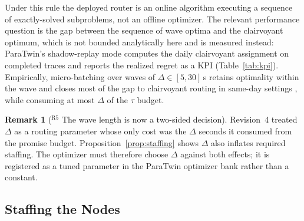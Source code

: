 \documentclass[10pt,twocolumn,letterpaper]{article}
\theoremstyle{definition}
\newtheorem{remark}{Remark}
\begin{document}
Under this rule the deployed router is an online algorithm executing a sequence of exactly-solved subproblems, not an offline optimizer. The relevant performance question is the gap between the sequence of wave optima and the clairvoyant optimum, which is not bounded analytically here and is measured instead: ParaTwin's shadow-replay mode computes the daily clairvoyant assignment on completed traces and reports the realized regret as a KPI (Table~\ref{tab:kpi}). Empirically, micro-batching over waves of $\Delta\in[5,30]$\,s retains optimality within the wave and closes most of the gap to clairvoyant routing in same-day settings \cite{klapp2018,ulmer2021}, while consuming at most $\Delta$ of the $\tau$ budget.

\begin{remark}[$^{\mathrm{R5}}$ The wave length is now a two-sided decision]
Revision~4 treated $\Delta$ as a routing parameter whose only cost was the $\Delta$ seconds it consumed from the promise budget. Proposition~\ref{prop:staffing} shows $\Delta$ also inflates required staffing. The optimizer must therefore choose $\Delta$ against both effects; it is registered as a tuned parameter in the ParaTwin optimizer bank rather than a constant.
\end{remark}

\subsection{Staffing the Nodes}
\end{document}
